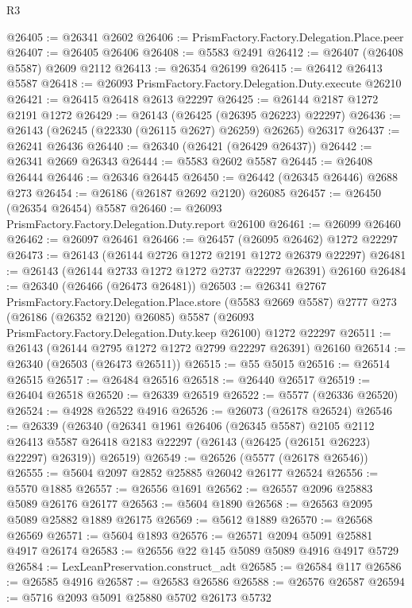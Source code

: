 \begin{lexlean}{R3}
\begin{coremodule}
@26405 := @26341 @2602
@26406 := PrismFactory.Factory.Delegation.Place.peer
@26407 := @26405 @26406
@26408 := @5583 @2491
@26412 := @26407 (@26408 @5587) @2609 @2112
@26413 := @26354 @26199
@26415 := @26412 @26413 @5587
@26418 := @26093 PrismFactory.Factory.Delegation.Duty.execute @26210
@26421 := @26415 @26418 @2613 @22297
@26425 := @26144 @2187 @1272 @2191 @1272
@26429 := @26143 (@26425 (@26395 @26223) @22297)
@26436 := @26143 (@26245 (@22330 (@26115 @2627) @26259) @26265) @26317
@26437 := @26241 @26436
@26440 := @26340 (@26421 (@26429 @26437))
@26442 := @26341 @2669 @26343
@26444 := @5583 @2602 @5587
@26445 := @26408 @26444
@26446 := @26346 @26445
@26450 := @26442 (@26345 @26446) @2688 @273
@26454 := @26186 (@26187 @2692 @2120) @26085
@26457 := @26450 (@26354 @26454) @5587
@26460 := @26093 PrismFactory.Factory.Delegation.Duty.report @26100
@26461 := @26099 @26460
@26462 := @26097 @26461
@26466 := @26457 (@26095 @26462) @1272 @22297
@26473 := @26143 (@26144 @2726 @1272 @2191 @1272 @26379 @22297)
@26481 := @26143 (@26144 @2733 @1272 @1272 @2737 @22297 @26391) @26160
@26484 := @26340 (@26466 (@26473 @26481))
@26503 := @26341
    @2767
    PrismFactory.Factory.Delegation.Place.store
    (@5583 @2669 @5587)
    @2777
    @273
    (@26186 (@26352 @2120) @26085)
    @5587
    (@26093 PrismFactory.Factory.Delegation.Duty.keep @26100)
    @1272
    @22297
@26511 := @26143 (@26144 @2795 @1272 @1272 @2799 @22297 @26391) @26160
@26514 := @26340 (@26503 (@26473 @26511))
@26515 := @55 @5015
@26516 := @26514 @26515
@26517 := @26484 @26516
@26518 := @26440 @26517
@26519 := @26404 @26518
@26520 := @26339 @26519
@26522 := @5577 (@26336 @26520)
@26524 := @4928 @26522 @4916
@26526 := @26073 (@26178 @26524)
@26546 := @26339
    (@26340
      (@26341
        @1961
        @26406
        (@26345 @5587)
        @2105
        @2112
        @26413
        @5587
        @26418
        @2183
        @22297
        (@26143 (@26425 (@26151 @26223) @22297) @26319))
      @26519)
@26549 := @26526 (@5577 (@26178 @26546))
@26555 := @5604 @2097 @2852 @25885 @26042 @26177 @26524
@26556 := @5570 @1885
@26557 := @26556 @1691
@26562 := @26557 @2096 @25883 @5089 @26176 @26177
@26563 := @5604 @1890
@26568 := @26563 @2095 @5089 @25882 @1889 @26175
@26569 := @5612 @1889
@26570 := @26568 @26569
@26571 := @5604 @1893
@26576 := @26571 @2094 @5091 @25881 @4917 @26174
@26583 := @26556 @22 @145 @5089 @5089 @4916 @4917 @5729
@26584 := LexLeanPreservation.construct_adt
@26585 := @26584 @117
@26586 := @26585 @4916
@26587 := @26583 @26586
@26588 := @26576 @26587
@26594 := @5716 @2093 @5091 @25880 @5702 @26173 @5732

\end{coremodule}
\end{lexlean}
